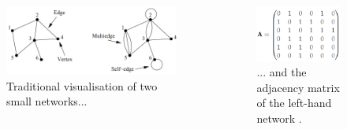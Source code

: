 \documentclass[serif, aspectratio=169]{beamer}
\begin{document}
\begin{frame}

\begin{columns}
\begin{column}{0.6\textwidth}
\begin{figure}
    \centering
    \includegraphics{figure/undirected_network}
\caption{Traditional visualisation of two small networks...}
\end{figure}
\end{column}
\begin{column}{0.4\textwidth}
\begin{figure}
    \centering
    \includegraphics{figure/undirected_adj_matrix}
\caption{... and the adjacency matrix of the left-hand network \autocite[111]{newman_networks_2010}.}
\end{figure}
\end{column}
\end{columns}
\end{frame}
\end{document}
